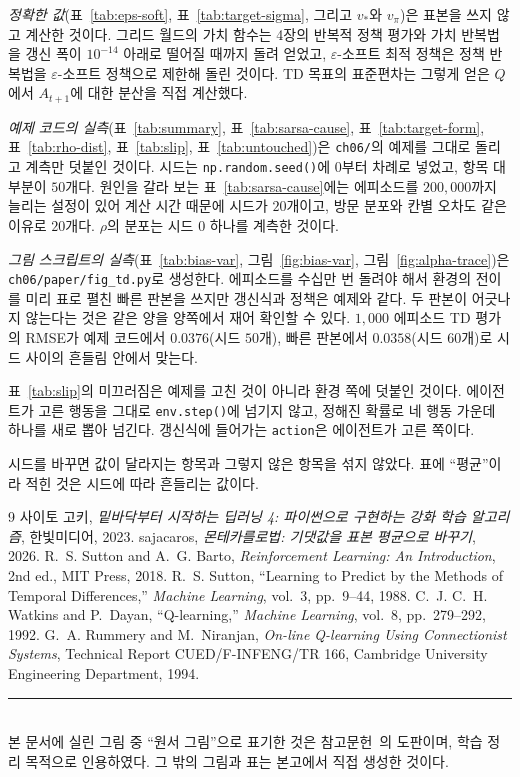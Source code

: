 \documentclass[11pt,a4paper]{article}
\begin{document}
\emph{정확한 값}(표~\ref{tab:eps-soft}, 표~\ref{tab:target-sigma}, 그리고 $v_*$와 $v_\pi$)은
표본을 쓰지 않고 계산한 것이다. 그리드 월드의 가치 함수는 4장의 반복적 정책 평가와 가치
반복법을 갱신 폭이 $10^{-14}$ 아래로 떨어질 때까지 돌려 얻었고, $\varepsilon$-소프트 최적 정책은
정책 반복법을 $\varepsilon$-소프트 정책으로 제한해 돌린 것이다. TD 목표의 표준편차는 그렇게 얻은
$Q$에서 $A_{t+1}$에 대한 분산을 직접 계산했다.

\emph{예제 코드의 실측}(표~\ref{tab:summary}, 표~\ref{tab:sarsa-cause}, 표~\ref{tab:target-form},
표~\ref{tab:rho-dist}, 표~\ref{tab:slip}, 표~\ref{tab:untouched})은 \texttt{ch06/}의 예제를
그대로 돌리고 계측만 덧붙인 것이다. 시드는 \lstinline|np.random.seed()|에 $0$부터 차례로 넣었고,
항목 대부분이 $50$개다. 원인을 갈라 보는 표~\ref{tab:sarsa-cause}에는 에피소드를 $200{,}000$까지
늘리는 설정이 있어 계산 시간 때문에 시드가 $20$개이고, 방문 분포와 칸별 오차도 같은 이유로
$20$개다. $\rho$의 분포는 시드 $0$ 하나를 계측한 것이다.

\emph{그림 스크립트의 실측}(표~\ref{tab:bias-var}, 그림~\ref{fig:bias-var},
그림~\ref{fig:alpha-trace})은 \texttt{ch06/paper/fig\_td.py}로 생성한다. 에피소드를 수십만 번
돌려야 해서 환경의 전이를 미리 표로 펼친 빠른 판본을 쓰지만 갱신식과 정책은 예제와 같다. 두 판본이
어긋나지 않는다는 것은 같은 양을 양쪽에서 재어 확인할 수 있다. $1{,}000$ 에피소드 TD 평가의 RMSE가
예제 코드에서 $0.0376$(시드 $50$개), 빠른 판본에서 $0.0358$(시드 $60$개)로 시드 사이의 흔들림
안에서 맞는다.

표~\ref{tab:slip}의 미끄러짐은 예제를 고친 것이 아니라 환경 쪽에 덧붙인 것이다. 에이전트가 고른
행동을 그대로 \lstinline|env.step()|에 넘기지 않고, 정해진 확률로 네 행동 가운데 하나를 새로 뽑아
넘긴다. 갱신식에 들어가는 \lstinline|action|은 에이전트가 고른 쪽이다.

시드를 바꾸면 값이 달라지는 항목과 그렇지 않은 항목을 섞지 않았다. 표에 ``평균''이라 적힌 것은
시드에 따라 흔들리는 값이다.


\begin{thebibliography}{9}
사이토 고키, \emph{밑바닥부터 시작하는 딥러닝 4: 파이썬으로 구현하는 강화 학습 알고리즘}, 한빛미디어, 2023.
sajacaros, \emph{몬테카를로법: 기댓값을 표본 평균으로 바꾸기}, 2026.
R.~S. Sutton and A.~G. Barto, \emph{Reinforcement Learning: An Introduction}, 2nd ed., MIT Press, 2018.
R.~S. Sutton, ``Learning to Predict by the Methods of Temporal Differences,''
\emph{Machine Learning}, vol.~3, pp.~9--44, 1988.
C.~J. C.~H. Watkins and P.~Dayan, ``Q-learning,'' \emph{Machine Learning}, vol.~8, pp.~279--292, 1992.
G.~A. Rummery and M.~Niranjan, \emph{On-line Q-learning Using Connectionist Systems},
Technical Report CUED/F-INFENG/TR 166, Cambridge University Engineering Department, 1994.
\end{thebibliography}

\vspace{4mm}
\noindent\rule{\linewidth}{0.4pt}\\
\footnotesize
본 문서에 실린 그림 중 ``원서 그림''으로 표기한 것은 참고문헌~\cite{dlfs4}의 도판이며, 학습 정리 목적으로
인용하였다. 그 밖의 그림과 표는 본고에서 직접 생성한 것이다.
\end{document}
